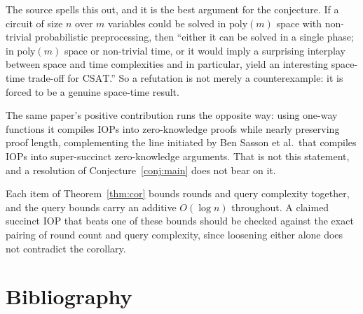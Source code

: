 \documentclass{conjura-conjecture}
\newcommand{\CSAT}{\mathrm{CSAT}}
\begin{document}
\begin{remark}\label{rem:refutation}
The source spells this out, and it is the best argument for the
conjecture. If a circuit of size $n$ over $m$ variables could be solved
in $\mathrm{poly}(m)$ space with non-trivial probabilistic preprocessing,
then ``either it can be solved in a single phase; in $\mathrm{poly}(m)$
space or non-trivial time, or it would imply a surprising interplay
between space and time complexities and in particular, yield an
interesting space-time trade-off for $\CSAT$.'' So a refutation is not
merely a counterexample: it is forced to be a genuine space-time result.
\end{remark}

\begin{remark}\label{rem:positive}
The same paper's positive contribution runs the opposite way: using
one-way functions it compiles IOPs into zero-knowledge proofs while
nearly preserving proof length, complementing the line initiated by Ben
Sasson et al.\ that compiles IOPs into super-succinct zero-knowledge
arguments. That is not this statement, and a resolution of
Conjecture~\ref{conj:main} does not bear on it.
\end{remark}

\begin{remark}\label{rem:queries}
Each item of Theorem~\ref{thm:cor} bounds rounds and query complexity
together, and the query bounds carry an additive $O(\log n)$ throughout.
A claimed succinct IOP that beats one of these bounds should be checked
against the exact pairing of round count and query complexity, since
loosening either alone does not contradict the corollary.
\end{remark}

\section{Bibliography}
\end{document}
